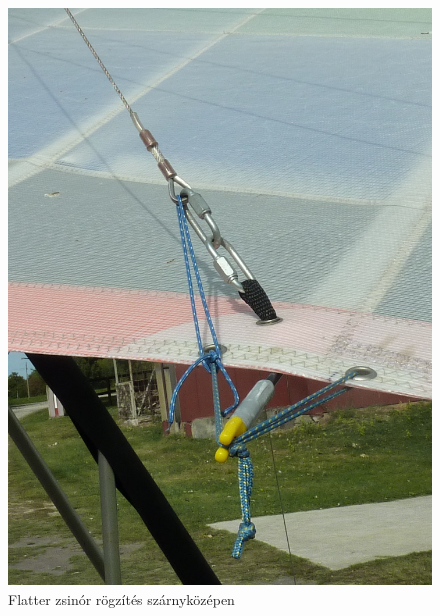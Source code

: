 \documentclass[a4paper,12pt]{report}
\begin{document}
\begin{figure}[ht!]
\centering
\includegraphics{kepek/2.jpg}
\caption{Flatter zsinór rögzítés szárnyközépen}\label{flatter2}
\end{figure}




%
% 
\end{document}

